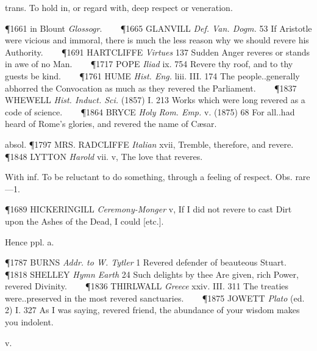 \begin{description}[wide, labelwidth=!, labelindent=0pt]
\begin{myenumerate}

 trans. To hold in, or regard with, deep respect or veneration.

\P 1661 in  Blount \textit{Glossogr}.    
\P 1665 GLANVILL  \textit{Def. Van. Dogm.} 53 If Aristotle were vicious and immoral, there is much the less reason why we should revere his Authority.    
\P 1691 HARTCLIFFE  \textit{Virtues} 137 Sudden Anger reveres or stands in awe of no Man.    
\P 1717 POPE  \textit{Iliad} ix. 754 Revere thy roof, and to thy guests be kind.    
\P 1761 HUME  \textit{Hist. Eng.} liii. III. 174 The people..generally abhorred the Convocation as much as they revered the Parliament.    
\P 1837 WHEWELL  \textit{Hist. Induct. Sci.} (1857) I. 213 Works which were long revered as a code of science.    
\P 1864 BRYCE  \textit{Holy Rom. Emp.} v. (1875) 68 For all..had heard of Rome's glories, and revered the name of Cæsar.

absol. \P 1797 MRS. RADCLIFFE  \textit{Italian} xvii, Tremble, therefore, and revere.    
\P 1848 LYTTON  \textit{Harold} vii. v, The love that reveres.

 With inf. To be reluctant to do something, through a feeling of respect. Obs. rare—1.

\P 1689 HICKERINGILL  \textit{Ceremony-Monger} v, If I did not revere to cast Dirt upon the Ashes of the Dead, I could [etc.].

\noindent Hence  ppl. a.

\P 1787 BURNS  \textit{Addr. to W. Tytler} 1 Revered defender of beauteous Stuart.    
\P 1818 SHELLEY  \textit{Hymn Earth} 24 Such delights by thee Are given, rich Power, revered Divinity.    
\P 1836 THIRLWALL  \textit{Greece} xxiv. III. 311 The treaties were..preserved in the most revered sanctuaries.    
\P 1875 JOWETT  \textit{Plato} (ed. 2) I. 327 As I was saying, revered friend, the abundance of your wisdom makes you indolent.
\end{myenumerate}


 v.

\noindent {}

\vspace{-0.3cm}

\begin{myenumerate}


\end{myenumerate}
\end{description}
